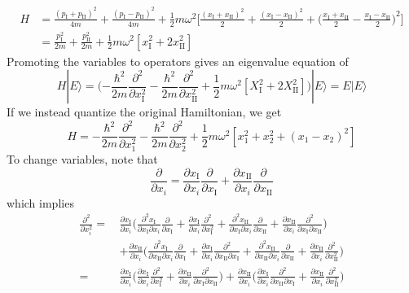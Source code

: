 \documentclass[../principles-of-quantum-mechanics.tex]{subfiles}
\begin{document}
\begin{questions}
\begin{solution}
			\begin{align*}
				H &= \frac{(p_\text{I} + p_\text{II})^2}{4m} + \frac{(p_\text{I} - p_\text{II})^2}{4m} + \frac{1}{2}m\omega^2\Big[\frac{(x_\text{I} + x_\text{II})^2}{2} + \frac{(x_\text{I} - x_\text{II})^2}{2} + \Big(\frac{x_\text{I} + x_\text{II}}{2} - \frac{x_\text{I} - x_\text{II}}{2}\Big)^2\Big] \\
				&= \frac{p_\text{I}^2}{2m} + \frac{p_\text{II}^2}{2m} + \frac{1}{2}m\omega^2[x_\text{I}^2 + 2x_\text{II}^2]
			\end{align*}
			 Promoting the variables to operators gives an eigenvalue equation of
			 $$H|E\rangle = \Big({-\frac{\hbar^2}{2m}\frac{\partial^2}{\partial x_\text{I}^2}} - \frac{\hbar^2}{2m}\frac{\partial^2}{\partial x_\text{II}^2} + \frac{1}{2}m\omega^2[X_\text{I}^2 + 2X_\text{II}^2]\Big)|E\rangle = E|E\rangle$$
			 If we instead quantize the original Hamiltonian, we get
			 $$H = {-\frac{\hbar^2}{2m}\frac{\partial^2}{\partial x_1^2}} - \frac{\hbar^2}{2m}\frac{\partial^2}{\partial x_2^2} + \frac{1}{2}m\omega^2[x_1^2 + x_2^2 + (x_1 - x_2)^2]$$
			 To change variables, note that
			 $$\frac{\partial}{\partial x_i} = \frac{\partial x_\text{I}}{\partial x_i}\frac{\partial}{\partial x_\text{I}} + \frac{\partial x_\text{II}}{\partial x_i}\frac{\partial}{\partial x_\text{II}}$$
			 which implies
			 \begin{align*}
			 	\frac{\partial^2}{\partial x_i^2} =\,&\frac{\partial x_\text{I}}{\partial x_i}\Big(\frac{\partial^2 x_\text{I}}{\partial x_\text{I}\partial x_i}\frac{\partial}{\partial x_\text{I}} + \frac{\partial x_\text{I}}{\partial x_i}\frac{\partial^2}{\partial x_\text{I}^2} + \frac{\partial^2 x_\text{II}}{\partial x_\text{I}\partial x_i}\frac{\partial }{\partial x_\text{II}} + \frac{\partial x_\text{II}}{\partial x_i}\frac{\partial^2 }{\partial x_\text{I}\partial x_\text{II}}\Big) \\
			 	&+ \frac{\partial x_\text{II}}{\partial x_i}\Big(\frac{\partial^2 x_\text{I}}{\partial x_\text{II}\partial x_i}\frac{\partial}{\partial x_\text{I}} + \frac{\partial x_\text{I}}{\partial x_i}\frac{\partial^2}{\partial x_\text{II}\partial x_\text{I}} + \frac{\partial^2 x_\text{II}}{\partial x_\text{II}\partial x_i}\frac{\partial }{\partial x_\text{II}} + \frac{\partial x_\text{II}}{\partial x_i}\frac{\partial^2 }{\partial x_\text{II}^2}\Big) \\
			 	=\,& \frac{\partial x_\text{I}}{\partial x_i}\Big(\frac{\partial x_\text{I}}{\partial x_i}\frac{\partial^2}{\partial x_\text{I}^2} + \frac{\partial x_\text{II}}{\partial x_i}\frac{\partial^2 }{\partial x_\text{I}\partial x_\text{II}}\Big) + \frac{\partial x_\text{II}}{\partial x_i}\Big(\frac{\partial x_\text{I}}{\partial x_i}\frac{\partial^2}{\partial x_\text{II}\partial x_\text{I}} + \frac{\partial x_\text{II}}{\partial x_i}\frac{\partial^2 }{\partial x_\text{II}^2}\Big)

\end{align*}
\end{solution}
\end{questions}
\end{document}
